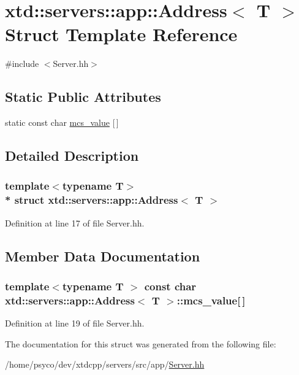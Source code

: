 \hypertarget{structxtd_1_1servers_1_1app_1_1Address}{}\section{xtd\+:\+:servers\+:\+:app\+:\+:Address$<$ T $>$ Struct Template Reference}
\label{structxtd_1_1servers_1_1app_1_1Address}


{\ttfamily \#include $<$Server.\+hh$>$}

\subsection*{Static Public Attributes}
\begin{DoxyCompactItemize}
\item 
static const char \hyperlink{structxtd_1_1servers_1_1app_1_1Address_a1768226cda5b8487c875fae8dc279ccf}{mcs\+\_\+value} \mbox{[}$\,$\mbox{]}
\end{DoxyCompactItemize}


\subsection{Detailed Description}
\subsubsection*{template$<$typename T$>$\\*
struct xtd\+::servers\+::app\+::\+Address$<$ T $>$}



Definition at line 17 of file Server.\+hh.



\subsection{Member Data Documentation}
\subsubsection[{\texorpdfstring{mcs\+\_\+value}{mcs_value}}]{\setlength{\rightskip}{0pt plus 5cm}template$<$typename T $>$ const char {\bf xtd\+::servers\+::app\+::\+Address}$<$ T $>$\+::mcs\+\_\+value\mbox{[}$\,$\mbox{]}\hspace{0.3cm}{\ttfamily [static]}}\hypertarget{structxtd_1_1servers_1_1app_1_1Address_a1768226cda5b8487c875fae8dc279ccf}{}\label{structxtd_1_1servers_1_1app_1_1Address_a1768226cda5b8487c875fae8dc279ccf}


Definition at line 19 of file Server.\+hh.



The documentation for this struct was generated from the following file\+:\begin{DoxyCompactItemize}
\item 
/home/psyco/dev/xtdcpp/servers/src/app/\hyperlink{Server_8hh}{Server.\+hh}\end{DoxyCompactItemize}
